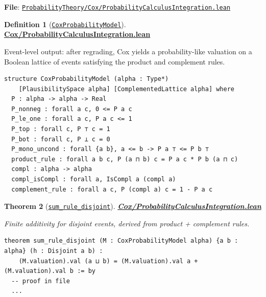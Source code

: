 \documentclass[11pt]{article}
\newtheorem{theorem}{Theorem}[section]
\theoremstyle{definition}
\newtheorem{definition}[theorem]{Definition}
\theoremstyle{remark}
\begin{document}
\textbf{File}: \href{https://github.com/zariuq/ks-foundations-of-inference/blob/main/ProbabilityTheory/Cox/ProbabilityCalculusIntegration.lean}{\texttt{ProbabilityTheory/Cox/ProbabilityCalculusIntegration.lean}}

\begin{definition}[\href{https://github.com/zariuq/ks-foundations-of-inference/blob/main/ProbabilityTheory/Cox/ProbabilityCalculusIntegration.lean}{\texttt{CoxProbabilityModel}}]
\textbf{\href{https://github.com/zariuq/ks-foundations-of-inference/blob/main/ProbabilityTheory/Cox/ProbabilityCalculusIntegration.lean}{Cox/ProbabilityCalculusIntegration.lean}}

Event-level output: after regrading, Cox yields a probability-like valuation on a Boolean lattice of events
satisfying the product and complement rules.
\end{definition}

\begin{lstlisting}[caption={Event-level Cox model (product + complement rules)}]
structure CoxProbabilityModel (alpha : Type*)
    [PlausibilitySpace alpha] [ComplementedLattice alpha] where
  P : alpha -> alpha -> Real
  P_nonneg : forall a c, 0 <= P a c
  P_le_one : forall a c, P a c <= 1
  P_top : forall c, P ⊤ c = 1
  P_bot : forall c, P ⊥ c = 0
  P_mono_uncond : forall {a b}, a <= b -> P a ⊤ <= P b ⊤
  product_rule : forall a b c, P (a ⊓ b) c = P a c * P b (a ⊓ c)
  compl : alpha -> alpha
  compl_isCompl : forall a, IsCompl a (compl a)
  complement_rule : forall a c, P (compl a) c = 1 - P a c
\end{lstlisting}

\begin{theorem}[\href{https://github.com/zariuq/ks-foundations-of-inference/blob/main/ProbabilityTheory/Cox/ProbabilityCalculusIntegration.lean}{\texttt{sum\_rule\_disjoint}}]
\textbf{\href{https://github.com/zariuq/ks-foundations-of-inference/blob/main/ProbabilityTheory/Cox/ProbabilityCalculusIntegration.lean}{Cox/ProbabilityCalculusIntegration.lean}}

Finite additivity for disjoint events, derived from product + complement rules.
\end{theorem}

\begin{lstlisting}[caption={Disjoint additivity derived from Cox rules}]
theorem sum_rule_disjoint (M : CoxProbabilityModel alpha) {a b : alpha} (h : Disjoint a b) :
    (M.valuation).val (a ⊔ b) = (M.valuation).val a + (M.valuation).val b := by
  -- proof in file
  ...
\end{lstlisting}
\end{document}
